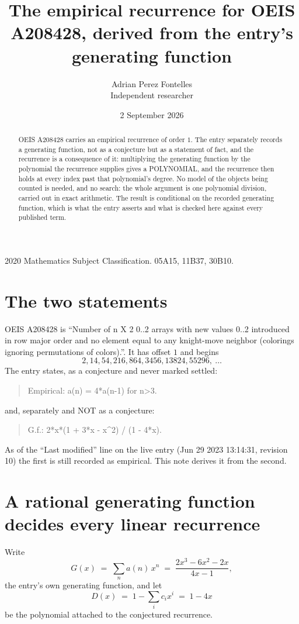 \documentclass[11pt,a4paper]{article}
\title{The empirical recurrence for OEIS A208428, derived from the entry's generating function}
\author{Adrian Perez Fontelles\\ \small Independent researcher}
\date{2 September 2026}
\theoremstyle{plain}
\theoremstyle{definition}
\begin{document}
\maketitle

\begin{abstract}
OEIS A208428 carries an empirical recurrence of order $1$. The entry separately records a
generating function, not as a conjecture but as a statement of fact, and the recurrence is a
consequence of it: multiplying the generating function by the polynomial the recurrence
supplies gives a POLYNOMIAL, and the recurrence then holds at every index past that
polynomial's degree. No model of the objects being counted is needed, and no search: the
whole argument is one polynomial division, carried out in exact arithmetic. The result is
conditional on the recorded generating function, which is what the entry asserts and what is
checked here against every published term.
\end{abstract}

\noindent\small 2020 Mathematics Subject Classification. 05A15, 11B37, 30B10.\normalsize

\section{The two statements}

OEIS A208428 is ``Number of n X 2 0..2 arrays with new values 0..2 introduced in row major order and no element equal to any knight-move neighbor (colorings ignoring permutations of colors).''. It has offset $1$ and begins
\[
2, 14, 54, 216, 864, 3456, 13824, 55296,\ \dots
\]
The entry states, as a conjecture and never marked settled:
\begin{quote}
Empirical: a(n) = 4*a(n-1) for n>3.
\end{quote}
and, separately and NOT as a conjecture:
\begin{quote}
G.f.: 2*x*(1 + 3*x - x\^{}2) / (1 - 4*x).
\end{quote}
As of the ``Last modified'' line on the live entry (Jun 29 2023 13:14:31, revision 10) the first is still
recorded as empirical. This note derives it from the second.

\section{A rational generating function decides every linear recurrence}

Write
\[
G(x)\;=\;\sum_{n}a(n)\,x^{n}\;=\;\frac{2 x^{3} - 6 x^{2} - 2 x}{4 x - 1},
\]
the entry's own generating function, and let
\[
D(x)\;=\;1-\sum_i c_i x^{i}\;=\;1 - 4 x
\]
be the polynomial attached to the conjectured recurrence.
\end{document}
